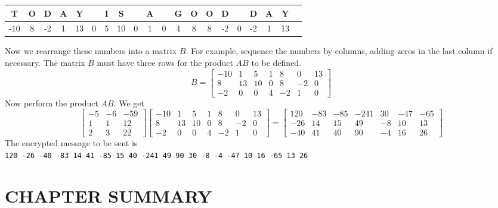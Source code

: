 \documentclass[../main.tex]{subfiles}
\begin{document}
\begin{example}
  \begin{table}[]
  \centering
    \begin{tabular}{|c|c|c|c|c|c|c|c|c|c|c|c|c|c|c|c|c|c|c|c|}
      \hline
      T & O & D & A & Y & & I & S & & A & & G & O & O & D & & D & A & Y\\ \hline
      -10 & 8 & -2 &  1 & 13 & 0 & 5 & 10 & 0 & 1 & 0 & 4 & 8 & 8 & -2 & 0 & -2 & 1 & 13\\ \hline
    \end{tabular}
  \end{table}
  Now we rearrange these numbers into a matrix \(B\). For example, sequence the numbers by columns, adding zeros in the last column if necessary. The matrix \(B\) must have three rows for the product \(AB\) to be defined.
  \begin{equation*}
    B = \begin{bmatrix}
      -10 & 1 & 5 & 1 & 8 & 0 & 13\\
      8 & 13 & 10 & 0 & 8 & -2 & 0\\
      -2 & 0 & 0 & 4 & -2 & 1 & 0
    \end{bmatrix}
  \end{equation*}
  Now perform the product \(AB\). We get 
\begin{equation*}
  \begin{bmatrix}
    -5 & -6 & -59\\
    1 & 1 & 12\\
    2 & 3 & 22
  \end{bmatrix}
  \begin{bmatrix}
    -10 & 1 & 5 & 1 & 8 & 0 & 13\\
    8 & 13 & 10 & 0 & 8 & -2 & 0\\
    -2 & 0 & 0 & 4 & -2 & 1 & 0
  \end{bmatrix}
  =\begin{bmatrix}
    120 & -83 & -85 & -241 & 30 & -47 & -65\\
    -26 & 14 & 15 & 49 & -8 & 10 & 13\\
    -40 & 41 & 40 & 90 & -4 & 16 & 26
  \end{bmatrix}
\end{equation*}
The encrypted message to be sent is\\
\texttt{120 -26 -40 -83 14 41 -85 15 40 -241 49 90 30 -8 -4 -47 10 16 -65 13 26}
\end{example}

\section{CHAPTER SUMMARY} \label{sec:4_5}
\end{document}
